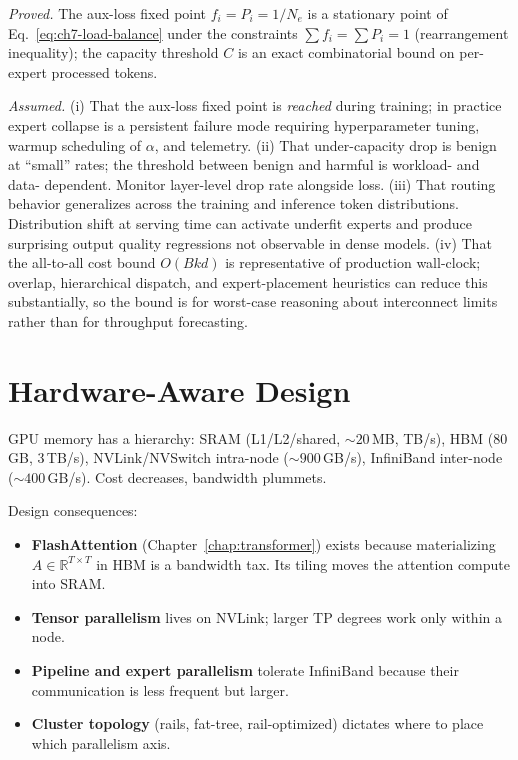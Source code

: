 \begin{provedassumed}
\emph{Proved.}
The aux-loss fixed point $f_i = P_i = 1/N_e$ is a stationary point of
Eq.~\eqref{eq:ch7-load-balance} under the constraints $\sum f_i
= \sum P_i = 1$ (rearrangement inequality); the capacity threshold
$C$ is an exact combinatorial bound on per-expert processed tokens.

\emph{Assumed.}
(i) That the aux-loss fixed point is \emph{reached} during training;
in practice expert collapse is a persistent failure mode requiring
hyperparameter tuning, warmup scheduling of $\alpha$, and telemetry.
(ii) That under-capacity drop is benign at ``small'' rates; the
threshold between benign and harmful is workload- and data-
dependent. Monitor layer-level drop rate alongside loss.
(iii) That routing behavior generalizes across the training and
inference token distributions. Distribution shift at serving time
can activate underfit experts and produce surprising output quality
regressions not observable in dense models.
(iv) That the all-to-all cost bound $O(B k d)$ is representative of
production wall-clock; overlap, hierarchical dispatch, and
expert-placement heuristics can reduce this substantially, so the
bound is for worst-case reasoning about interconnect limits rather
than for throughput forecasting.
\end{provedassumed}

\section{Hardware-Aware Design}

GPU memory has a hierarchy: SRAM (L1/L2/shared, $\sim\!20$\,MB, TB/s),
HBM (80\,GB, 3\,TB/s), NVLink/NVSwitch intra-node
($\sim\!900$\,GB/s), InfiniBand inter-node ($\sim\!400$\,GB/s). Cost
decreases, bandwidth plummets.

Design consequences:
\begin{itemize}
  \item \textbf{FlashAttention} (Chapter~\ref{chap:transformer}) exists because
        materializing $A \in \mathbb{R}^{T \times T}$ in HBM is a
        bandwidth tax. Its tiling moves the attention compute into
        SRAM.
  \item \textbf{Tensor parallelism} lives on NVLink; larger TP
        degrees work only within a node.
  \item \textbf{Pipeline and expert parallelism} tolerate InfiniBand
        because their communication is less frequent but larger.
  \item \textbf{Cluster topology} (rails, fat-tree, rail-optimized)
        dictates where to place which parallelism axis.
\end{itemize}

